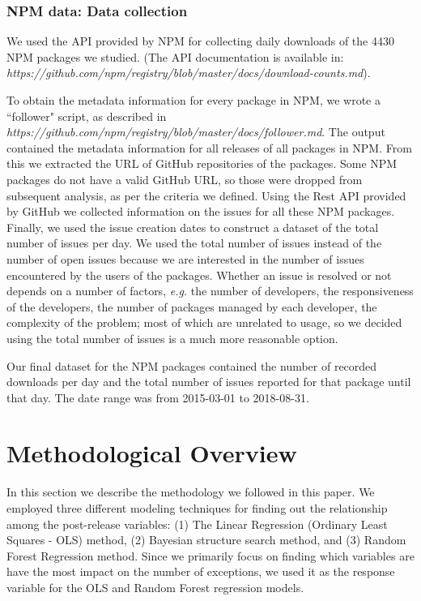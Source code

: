 \documentclass[smallcondensed]{svjour3}     %
\begin{document}
\vspace{-10pt}
\subsubsection{NPM data: Data collection}

We used the API provided by NPM for collecting daily downloads of the 4430 NPM packages we studied. (The API documentation is available in:\\ \textit{https://github.com/npm/registry/blob/master/docs/download-counts.md}).

To obtain the metadata information for every package in NPM, we wrote a ``follower" script, as described in 
\\ \textit{https://github.com/npm/registry/blob/master/docs/follower.md}.
The output contained the metadata information for all releases of all packages in NPM. From this we extracted the URL of GitHub repositories of the packages. Some NPM packages do not have a valid GitHub URL, so those were dropped from subsequent analysis, as per the criteria we defined. Using the Rest API provided by GitHub we collected information on the issues for all these NPM packages. Finally, we used the issue creation dates to construct a dataset of the total number of issues per day. We used the total number of issues instead of the number of open issues because we are interested in the number of issues encountered by the users of the packages. Whether an issue is resolved or not depends on a number of factors, \emph{e.g.} the number of developers, the responsiveness of the developers, the number of packages managed by each developer, the complexity of the problem; most of which are unrelated to usage, so we decided using the total number of issues is a much more reasonable option.

Our final dataset for the NPM packages contained the number of recorded downloads per day and the total number of issues reported for that package until that day. The date range was from 2015-03-01 to 2018-08-31. 

\section{Methodological Overview}\label{s:method}

In this section we describe the methodology we followed in this paper. We employed three different modeling techniques for finding out the relationship among the post-release variables: (1) The Linear Regression (Ordinary Least Squares - OLS) method, (2) Bayesian structure search method, and (3) Random Forest Regression method. Since we primarily focus on finding which variables are have the most impact on the number of exceptions, we used it as the response variable for the OLS and Random Forest regression models. 
\end{document}

